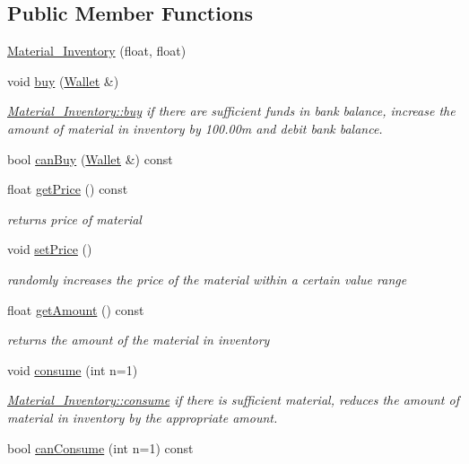 \subsection*{Public Member Functions}
\begin{DoxyCompactItemize}
\item 
\hyperlink{classMaterial__Inventory_a996e5441abe78653a8cb386a499a4063}{Material\+\_\+\+Inventory} (float, float)
\item 
void \hyperlink{classMaterial__Inventory_a5be24d53377c58ea2391e0f872d199d8}{buy} (\hyperlink{classWallet}{Wallet} \&)
\begin{DoxyCompactList}\small\item\em \hyperlink{classMaterial__Inventory_a5be24d53377c58ea2391e0f872d199d8}{Material\+\_\+\+Inventory\+::buy} if there are sufficient funds in bank balance, increase the amount of material in inventory by 100.\+00m and debit bank balance. \end{DoxyCompactList}\item 
bool \hyperlink{classMaterial__Inventory_abb1d889d0af7b79da3b5100a409a5140}{can\+Buy} (\hyperlink{classWallet}{Wallet} \&) const
\item 
float \hyperlink{classMaterial__Inventory_a3e3bf78a963137fdf3be88cecbdcb778}{get\+Price} () const
\begin{DoxyCompactList}\small\item\em returns price of material \end{DoxyCompactList}\item 
void \hyperlink{classMaterial__Inventory_a1ae3a7d9e3d42c8d5bfee551605722ee}{set\+Price} ()
\begin{DoxyCompactList}\small\item\em randomly increases the price of the material within a certain value range \end{DoxyCompactList}\item 
float \hyperlink{classMaterial__Inventory_acc6a2d2b8dc613689561b0165d591fb1}{get\+Amount} () const
\begin{DoxyCompactList}\small\item\em returns the amount of the material in inventory \end{DoxyCompactList}\item 
void \hyperlink{classMaterial__Inventory_a8c281edc32968e93c0a820ed29ccf3d5}{consume} (int n=1)
\begin{DoxyCompactList}\small\item\em \hyperlink{classMaterial__Inventory_a8c281edc32968e93c0a820ed29ccf3d5}{Material\+\_\+\+Inventory\+::consume} if there is sufficient material, reduces the amount of material in inventory by the appropriate amount. \end{DoxyCompactList}\item 
bool \hyperlink{classMaterial__Inventory_a21e999476b95f52063d222ef892887ba}{can\+Consume} (int n=1) const
\end{DoxyCompactItemize}
